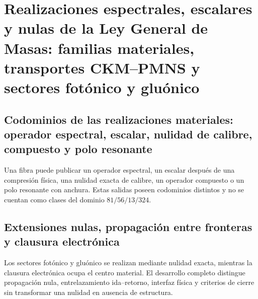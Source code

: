 \chapter{Realizaciones espectrales, escalares y nulas de la Ley General de Masas: familias materiales, transportes CKM–PMNS y sectores fotónico y gluónico}
\label{chap:realizaciones-familias-mezclas-masas}

\section{Codominios de las realizaciones materiales: operador espectral, escalar, nulidad de calibre, compuesto y polo resonante}
Una fibra puede publicar un operador espectral, un escalar después de una
compresión física, una nulidad exacta de calibre, un operador compuesto o un
polo resonante con anchura. Estas salidas poseen codominios distintos y no se
cuentan como clases del dominio \(81/56/13/324\).

\section{Extensiones nulas, propagación entre fronteras y clausura electrónica}

Los sectores fotónico y gluónico se realizan mediante nulidad exacta, mientras
la clausura electrónica ocupa el centro material. El desarrollo completo
distingue propagación nula, entrelazamiento ida--retorno, interfaz física y
criterios de cierre sin transformar una nulidad en ausencia de estructura.

\begingroup
\let\chapter\section
\let\section\subsection
\let\subsection\subsubsection
\let\subsubsection\paragraph
\let\clearpage\relax
\let\cleardoublepage\relax

\endgroup

